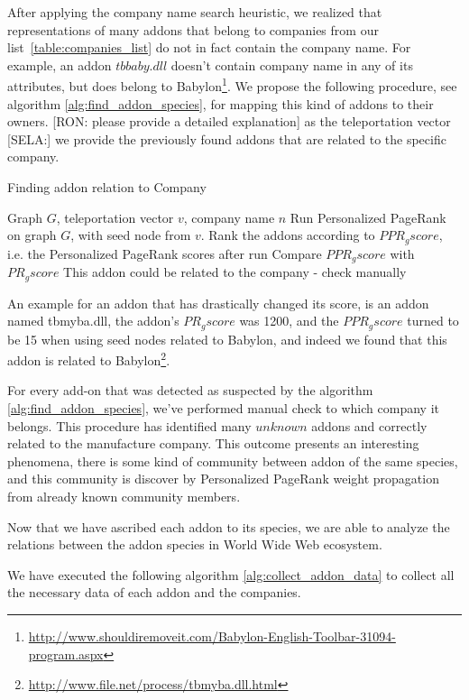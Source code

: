 \documentclass[11pt,oneside]{book}
\begin{document}
After applying the company name search heuristic, we realized that representations of many addons that belong to companies from our list~\autoref{table:companies_list} do not in fact contain the company name. For example, an addon $tbbaby.dll$ doesn't contain company name in any of its attributes, but does belong to Babylon\footnote{\url{http://www.shouldiremoveit.com/Babylon-English-Toolbar-31094-program.aspx}}. 
We propose the following procedure, see algorithm \autoref{alg:find_addon_species}, for mapping this kind of addons to their owners. [RON: please provide a detailed explanation] as the teleportation vector [SELA:] we provide the previously found addons that are related to the specific company.

\begin{algorithm}[!t]
\caption{Finding addon relation to Company}
\label{alg:find_addon_species}
\begin{algorithmic}[1] 
\REQUIRE Graph $G$, teleportation vector $v$, company name $n$
\STATE Run Personalized PageRank on graph $G$, with seed node from $v$.
\STATE Rank the addons according to $PPR_gscore$, i.e. the Personalized PageRank scores after run
\STATE Compare $PPR_gscore$ with $PR_gscore$
\STATE This addon could be related to the company - check manually
\ENDIF
\ENDFOR
\end{algorithmic}
\end{algorithm}
An example for an addon that has drastically changed its score, is an addon named tbmyba.dll, the addon's $PR_gscore$ was 1200, and the $PPR_gscore$ turned to be 15 when using seed nodes related to Babylon, and indeed we found that this addon is related to Babylon\footnote{\url{http://www.file.net/process/tbmyba.dll.html}}.

For every add-on that was detected as suspected by the algorithm \autoref{alg:find_addon_species}, we've performed manual check to which company it belongs. This procedure has identified many $unknown$ addons and correctly related to the manufacture company. This outcome presents an interesting phenomena, there is some kind of community between addon of the same species, and this community is discover by Personalized PageRank weight propagation from already known community members.

Now that we have ascribed each addon to its species, we are able to analyze the relations between the addon species in World Wide Web ecosystem.

We have executed the following algorithm \autoref{alg:collect_addon_data} to collect all the necessary data of each addon and the companies.
\end{document}
